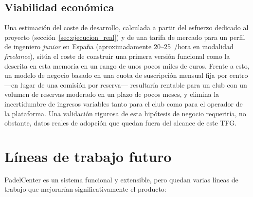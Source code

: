 \subsection{Viabilidad económica}

Una estimación del coste de desarrollo, calculada a partir del esfuerzo
dedicado al proyecto (sección~\ref{sec:ejecucion_real}) y de una tarifa de
mercado para un perfil de ingeniero \textit{junior} en España
(aproximadamente 20--25~\texteuro/hora en modalidad \textit{freelance}),
sitúa el coste de construir una primera versión funcional como la descrita en
esta memoria en un rango de unos pocos miles de euros. Frente a esto, un
modelo de negocio basado en una cuota de suscripción mensual fija por centro
—en lugar de una comisión por reserva— resultaría rentable para un club con un
volumen de reservas moderado en un plazo de pocos meses, y elimina la
incertidumbre de ingresos variables tanto para el club como para el operador
de la plataforma. Una validación rigurosa de esta hipótesis de negocio
requeriría, no obstante, datos reales de adopción que quedan fuera del alcance
de este TFG.

\section{Líneas de trabajo futuro}
\label{sec:lineas_futuras}

PadelCenter es un sistema funcional y extensible, pero quedan varias líneas de
trabajo que mejorarían significativamente el producto:

